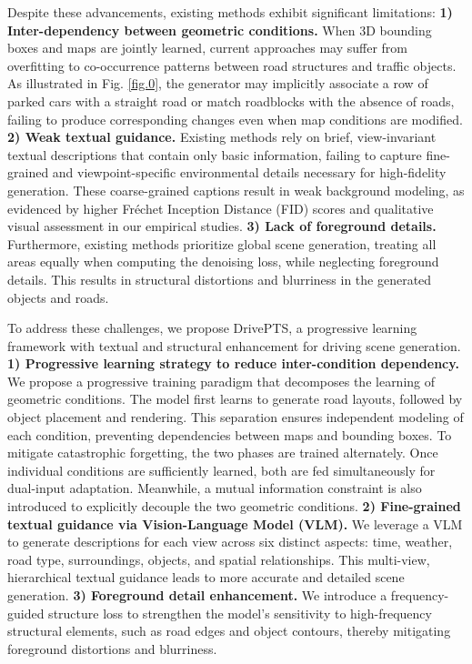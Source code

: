 Despite these advancements, existing methods exhibit significant limitations:
\textbf{1) Inter-dependency between geometric conditions.}
When 3D bounding boxes and maps are jointly learned, current approaches may suffer from overfitting to co-occurrence patterns between road structures and traffic objects. As illustrated in  Fig. \ref{fig.0}, the generator may implicitly associate a row of parked cars with a straight road or match roadblocks with the absence of roads, failing to produce corresponding changes even when map conditions are modified.
\textbf{2) Weak  textual guidance.}
Existing methods rely on brief, view-invariant textual descriptions that contain only basic information, failing to capture fine-grained and viewpoint-specific environmental details necessary for high-fidelity generation. 
These coarse-grained captions result in weak background modeling, as evidenced by higher Fréchet Inception Distance (FID) scores and qualitative visual assessment in our empirical studies.
\textbf{3) Lack of foreground details.}
Furthermore, existing methods prioritize global scene generation, treating all areas equally when computing the denoising loss, while neglecting foreground details. This results in structural distortions and blurriness in the generated objects and roads.


To address these challenges, we propose DrivePTS, a progressive learning framework with textual and structural enhancement for driving scene generation.
\textbf{1) Progressive learning strategy to reduce inter-condition dependency.} 
We propose a progressive training paradigm that decomposes the learning of geometric conditions. 
The model first learns to generate road layouts, followed by object placement and rendering. This separation ensures independent modeling of each condition, preventing dependencies between maps and bounding boxes. 
To mitigate catastrophic forgetting, the two phases are trained alternately. 
Once individual conditions are sufficiently learned, both are fed simultaneously for dual-input adaptation. 
Meanwhile, a mutual information constraint is also introduced to explicitly decouple the two geometric conditions.
\textbf{2) Fine-grained textual guidance via Vision-Language Model (VLM).}
We leverage a VLM to generate descriptions for each view across six distinct aspects: time, weather, road type, surroundings, objects, and spatial relationships. This multi-view, hierarchical textual guidance leads to more accurate and detailed scene generation.
\textbf{3) Foreground detail enhancement.}
We introduce a frequency-guided structure loss to strengthen the model's sensitivity to high-frequency structural elements, such as road edges and object contours, thereby mitigating  foreground distortions and blurriness.

